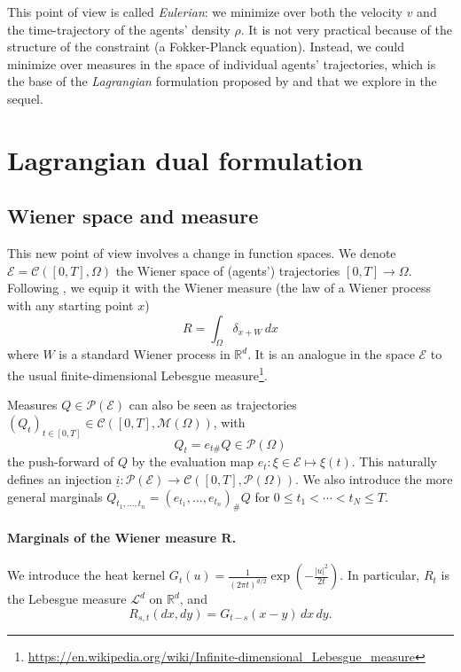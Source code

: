 \documentclass{article}
\newcommand{\RR}{\mathbb{R}}
\newcommand{\calC}{\mathcal{C}}
\newcommand{\calP}{\mathcal{P}}
\newcommand{\calM}{\mathcal{M}}
\begin{document}
	This point of view \cite{benamou:hal-01295299} is called \textit{Eulerian}: we minimize over both the velocity $v$ and the time-trajectory of the agents' density $\rho$. It is not very practical because of the structure of the constraint (a Fokker-Planck equation). Instead, we could minimize over measures in the space of individual agents' trajectories, which is the base of the \textit{Lagrangian} formulation \cite{benamou2015lagrangian,benamou:hal-01295299} proposed by \citeauthor{benamou:hal-01295299} and that we explore in the sequel.


	\section{Lagrangian dual formulation}
    
    \subsection{Wiener space and measure}
    
    This new point of view involves a change in function spaces. We denote $\mathscr{E} = \calC([0,T], \Omega)$ the Wiener space of (agents') trajectories $[0,T] \rightarrow\Omega$. Following \cites{benamou:hal-01295299,benamou2015lagrangian}, we equip it with the Wiener measure (the law of a Wiener process with any starting point $x$)
    \[
    	R = \int_\Omega \delta_{x + W}\,dx
    \]
   	where $W$ is a standard Wiener process in $\RR^d$. It is an analogue in the space $\mathscr{E}$ to the usual finite-dimensional Lebesgue measure\footnote{\url{https://en.wikipedia.org/wiki/Infinite-dimensional_Lebesgue_measure}}.
   	
   	Measures $Q \in \calP(\mathscr{E})$ can also be seen as trajectories $(Q_t)_{t\in[0,T]} \in \calC([0,T], \calM(\Omega))$, with
    \[
    	Q_t = e_{t\#}Q \in \calP(\Omega)
    \]
    the push-forward of $Q$ by the evaluation map $e_t\colon \xi\in\mathscr{E}\longmapsto \xi(t)$. This naturally defines an injection $\underline{i} \colon \calP(\mathscr{E}) \rightarrow \calC([0,T], \calP(\Omega))$. We also introduce the more general marginals $Q_{t_1,\ldots,t_n} = (e_{t_1},\ldots, e_{t_n})_\# Q$ for $0\leq t_1 < \cdots < t_N \leq T$.
    
    \paragraph{Marginals of the Wiener measure $\boldsymbol{R}$.} We introduce the heat kernel
    $G_t(u) =
    \frac{1}{(2\pi t)^{d/2}} \exp\left(-\frac{|u|^2}{2t}\right)$.
    In particular, $R_t$ is the Lebesgue measure $\mathcal{L}^d$ on $\RR^d$, and
    \begin{equation}\label{eq:2MarginWienerMeasure}
    	R_{s,t}(dx,dy) = G_{t-s}(x-y)\,dx\,dy.
    \end{equation}
    
\end{document}
